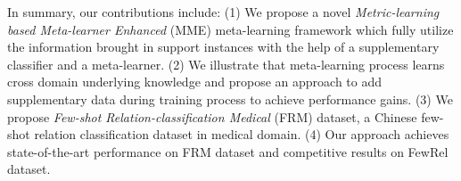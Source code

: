 In summary, our contributions include: (1) We propose a novel \emph{Metric-learning based Meta-learner Enhanced} (MME) meta-learning framework which fully utilize the information brought in support instances with the help of a supplementary classifier and a meta-learner. (2) We illustrate that meta-learning process learns cross domain underlying knowledge and propose an approach to add supplementary data during training process to achieve performance gains. (3) We propose \emph{Few-shot Relation-classification Medical} (FRM) dataset, a Chinese few-shot relation classification dataset in medical domain. (4) Our approach achieves state-of-the-art performance on FRM dataset and competitive results on FewRel \citep{han-etal-2018-fewrel} dataset.
